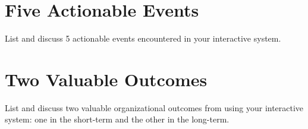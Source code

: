 \documentclass[11pt,fleqn]{book} %
\begin{document}

\chapter{Five Actionable Events}
List and discuss 5 actionable events encountered in your interactive system.


\chapter{Two Valuable Outcomes}
List and discuss two valuable organizational outcomes from using your interactive system: one in the short-term and the other in the long-term. 




\vfill
\end{document}
